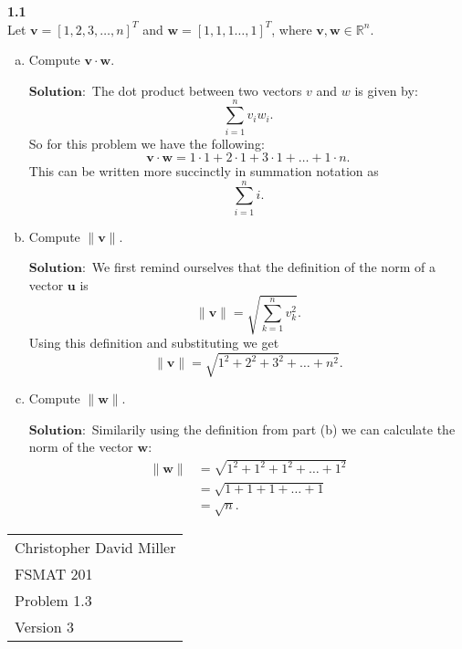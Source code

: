 \documentclass[12pt]{article}
\begin{document}
    
    \textbf{1.1} \\  
    
        Let $\mathbf{v} = [1,2,3,\dots ,n]^T$ and $\mathbf{w} = [1,1,1\dots,1]^T$, where $\mathbf{v},\mathbf{w} \in \mathbb{R}^n$.
    
    
    \begin{enumerate}[(a)]
        \item Compute $\mathbf{v} \cdot \mathbf{w}$.
        
            $\textbf{Solution}:$ The dot product between two vectors $v$ and $w$ is given by:\[
              \sum_{i=1}^n v_iw_i  
            .\]
            So for this problem we have the following:
            \[
            \mathbf{v} \cdot \mathbf{w} = 1\cdot1 + 2 \cdot 1 + 3 \cdot 1 + \dots + 1 \cdot n
            .\]
            This can be written more succinctly in summation notation as
            \[
            \sum_{i=1}^n i
            .\]
        \item Compute $\|\mathbf{v}\|$.        
        
            $\textbf{Solution}:$ We first remind ourselves that the definition of the norm of a vector $\mathbf{u}$ is \[
                \|  \mathbf{v} \| = \sqrt{\sum_{k=1}^{n}v_k^2}
            .\]
            Using this definition and substituting we get\[
                \|  \mathbf{v} \| = \sqrt{1^2 + 2^2 + 3^2 + \dots +n^2}
            .\]
        \item Compute $\|\mathbf{w}\|$.
                
        $\textbf{Solution}:$ Similarily using the definition from part (b) we can calculate the norm of the vector $\mathbf{w}$:
        \begin{align*}
            \|  \mathbf{w} \|& = \sqrt{1^2 + 1^2 + 1^2 + \dots +1^2}\\
            & = \sqrt{1 + 1 + 1 + \dots +1}\\
            & = \sqrt{n}
        .\end{align*}
       
    \end{enumerate}

\newpage
\begin{flushright}
    \begin{tabular}{l}
    Christopher David Miller \\  %
    FSMAT 201 \\  %
    Problem 1.3 \\  %
    Version 3 \\ %
    \end{tabular}
    \end{flushright}
    \vspace{20pt}  %
    
\end{document}
